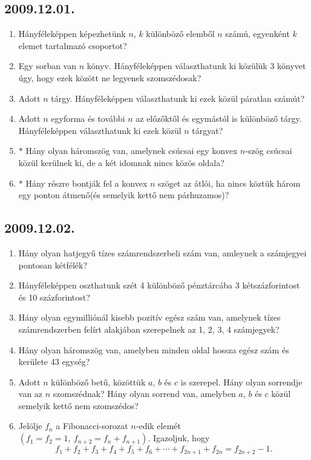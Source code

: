 \documentclass{article}
\begin{document}
\subsection*{2009.12.01.}
\begin{enumerate}
\item Hányféleképpen képezhetünk $n$, $k$ különböző elemből $n$ számú, egyenként $k$ elemet tartalmazó csoportot?
\item Egy sorban van $n$ könyv. Hányféleképpen választhatunk ki közülük 3 könyvet úgy, hogy ezek között ne legyenek szomszédosak?
\item Adott $n$ tárgy. Hányféleképpen választhatunk ki ezek közül páratlan számút?
\item Adott $n$ egyforma és további $n$ az előzőktől és egymástól is különböző tárgy. Hányféleképpen választhatunk ki ezek közül $n$ tárgyat?
\item $*$ Hány olyan háromszög van, amelynek csúcsai egy konvex $n$-szög csúcsai közül kerülnek ki, de a két idomnak nincs közös oldala?
\item $*$ Hány részre bontják fel a konvex $n$ szöget az átlói, ha nincs köztük három egy ponton átmenő(és semelyik kettő nem párhuzamos)?
\end{enumerate}

\subsection*{2009.12.02.}
\begin{enumerate}
\item Hány olyan hatjegyű tízes számrendszerbeli szám van, amleynek a számjegyei pontosan kétfélék?
\item Hányféleképpen oszthatunk szét 4 különböző pénztárcába 3 kétszázforintost és 10 százforintost?
\item Hány olyan egymilliónál kisebb pozitív egész szám van, amelynek tízes számrendszerben felírt alakjában szerepelnek az 1, 2, 3, 4 számjegyek?
\item Hány olyan háromszög van, amelyben minden oldal hossza egész szám és kerülete 43 egység?
\item Adott $n$ különböző betű, közöttük $a$, $b$ és $c$ is szerepel. Hány olyan sorrendje van az $n$ szomszédnak? Hány olyan sorrend van, amelyben $a$, $b$ és $c$ közül semelyik kettő nem szomszédos?
\item Jelölje $f_n$ a Fibonacci-sorozat $n$-edik elemét $(f_1=f_2=1,~f_{n+2}=f_n+f_{n+1})$. Igazoljuk, hogy $$f_1+f_2+f_3+f_4+f_5+f_6+\cdots +f_{2n+1}+f_{2n}=f_{2n+2}-1.$$
\end{enumerate}
\end{document}
